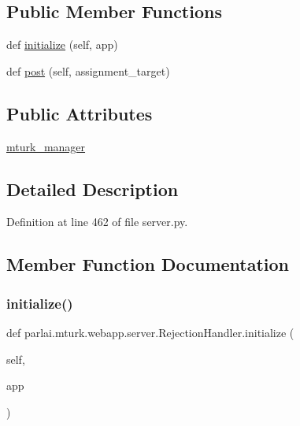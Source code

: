 \subsection*{Public Member Functions}
\begin{DoxyCompactItemize}
\item 
def \hyperlink{classparlai_1_1mturk_1_1webapp_1_1server_1_1RejectionHandler_af55902f1aecca9cde35328c8356525ce}{initialize} (self, app)
\item 
def \hyperlink{classparlai_1_1mturk_1_1webapp_1_1server_1_1RejectionHandler_ab53a292bed562b166bd63ef81ae38a43}{post} (self, assignment\+\_\+target)
\end{DoxyCompactItemize}
\subsection*{Public Attributes}
\begin{DoxyCompactItemize}
\item 
\hyperlink{classparlai_1_1mturk_1_1webapp_1_1server_1_1RejectionHandler_add298625ab3b54fd34cc774e7eeb9e7c}{mturk\+\_\+manager}
\end{DoxyCompactItemize}


\subsection{Detailed Description}


Definition at line 462 of file server.\+py.



\subsection{Member Function Documentation}
\mbox{\label{classparlai_1_1mturk_1_1webapp_1_1server_1_1RejectionHandler_af55902f1aecca9cde35328c8356525ce}} 
\subsubsection{\texorpdfstring{initialize()}{initialize()}}
{\footnotesize\ttfamily def parlai.\+mturk.\+webapp.\+server.\+Rejection\+Handler.\+initialize (\begin{DoxyParamCaption}\item[{}]{self,  }\item[{}]{app }\end{DoxyParamCaption})}



